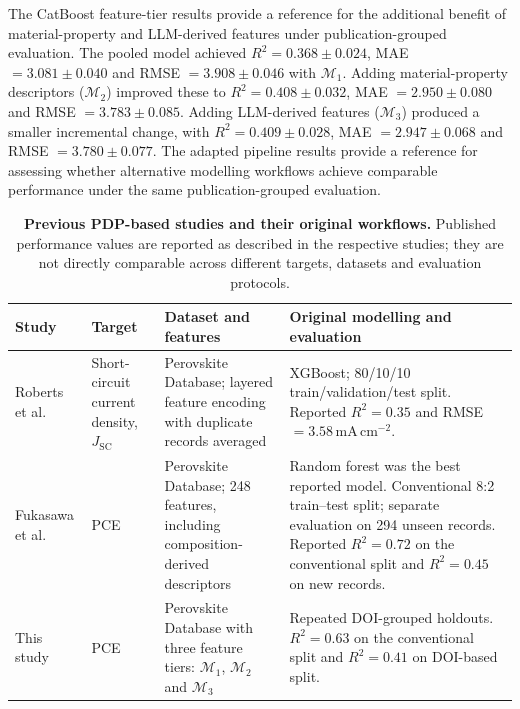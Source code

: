 \documentclass[3p]{elsarticle}
\begin{document}
The CatBoost feature-tier results provide a reference for the additional benefit of material-property and LLM-derived features under publication-grouped evaluation. The pooled model achieved $R^2=0.368\pm0.024$, MAE $=3.081\pm0.040$ and RMSE $=3.908\pm0.046$ with $\mathcal{M}_1$. Adding material-property descriptors ($\mathcal{M}_2$) improved these to $R^2=0.408\pm0.032$, MAE $=2.950\pm0.080$ and RMSE $=3.783\pm0.085$. Adding LLM-derived features ($\mathcal{M}_3$) produced a smaller incremental change, with $R^2=0.409\pm0.028$, MAE $=2.947\pm0.068$ and RMSE $=3.780\pm0.077$. The adapted pipeline results provide a reference for assessing whether alternative modelling workflows achieve comparable performance under the same publication-grouped evaluation.

\begin{table}[h]
    \centering
    \small
    \caption{\textbf{Previous PDP-based studies and their original workflows.} Published performance values are reported as described in the respective studies; they are not directly comparable across different targets, datasets and evaluation protocols.}
    \label{tab:previous_pdp_studies}
    \begin{tabular}{p{2.5cm}p{2.1cm}p{4.3cm}p{4.0cm}}
        \toprule
        Study & Target & Dataset and features & Original modelling and evaluation \\
        \midrule
        Roberts et al.\ \cite{roberts2024machine}
        & Short-circuit current density, $J_{\mathrm{SC}}$
        & Perovskite Database; layered feature encoding with duplicate records averaged
        & XGBoost; 80/10/10 train/validation/test split. Reported $R^2=0.35$ and RMSE $=3.58\,\mathrm{mA\,cm^{-2}}$. \\

        Fukasawa et al.\ \cite{fukasawa2024effectiveness}
        & PCE
        & Perovskite Database; 248 features, including composition-derived descriptors
        & Random forest was the best reported model. Conventional 8:2 train--test split; separate evaluation on 294 unseen records. Reported $R^2=0.72$ on the conventional split and $R^2=0.45$ on new records. \\

        This study
        & PCE
        & Perovskite Database with three feature tiers: $\mathcal{M}_1$, $\mathcal{M}_2$ and $\mathcal{M}_3$
        & Repeated DOI-grouped holdouts. $R^2=0.63$ on the conventional split and $R^2=0.41$ on DOI-based split. \\
        \bottomrule
    \end{tabular}
\end{table}
\end{document}
